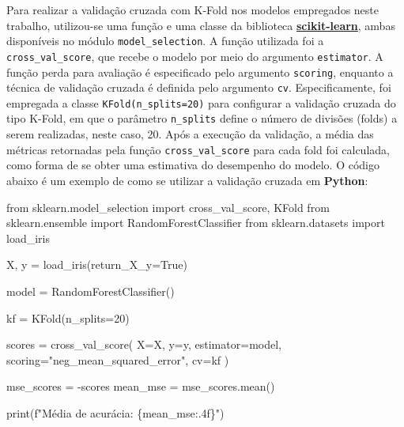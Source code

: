 \documentclass[
  12pt,
  a4paper,
]{scrreprt}
\newenvironment{Shaded}{}{}
\newcommand{\BuiltInTok}[1]{\textcolor[rgb]{0.84,0.23,0.29}{#1}}
\newcommand{\DecValTok}[1]{\textcolor[rgb]{0.00,0.36,0.77}{#1}}
\newcommand{\ImportTok}[1]{\textcolor[rgb]{0.01,0.18,0.38}{#1}}
\newcommand{\NormalTok}[1]{\textcolor[rgb]{0.14,0.16,0.18}{#1}}
\newcommand{\OperatorTok}[1]{\textcolor[rgb]{0.14,0.16,0.18}{#1}}
\newcommand{\SpecialCharTok}[1]{\textcolor[rgb]{0.00,0.36,0.77}{#1}}
\newcommand{\SpecialStringTok}[1]{\textcolor[rgb]{0.01,0.18,0.38}{#1}}
\newcommand{\StringTok}[1]{\textcolor[rgb]{0.01,0.18,0.38}{#1}}
\newcommand{\VariableTok}[1]{\textcolor[rgb]{0.89,0.38,0.04}{#1}}
\begin{document}
\vspace{12pt}

Para realizar a validação cruzada com K-Fold nos modelos empregados
neste trabalho, utilizou-se uma função e uma classe da biblioteca
\href{https://scikit-learn.org/stable/}{\textbf{scikit-learn}}, ambas
disponíveis no módulo \texttt{model\_selection}. A função utilizada foi
a \texttt{cross\_val\_score}, que recebe o modelo por meio do argumento
\texttt{estimator}. A função perda para avaliação é especificado pelo
argumento \texttt{scoring}, enquanto a técnica de validação cruzada é
definida pelo argumento \texttt{cv}. Especificamente, foi empregada a
classe \texttt{KFold(n\_splits=20)} para configurar a validação cruzada
do tipo K-Fold, em que o parâmetro \texttt{n\_splits} define o número de
divisões (folds) a serem realizadas, neste caso, 20. Após a execução da
validação, a média das métricas retornadas pela função
\texttt{cross\_val\_score} para cada fold foi calculada, como forma de
se obter uma estimativa do desempenho do modelo. O código abaixo é um
exemplo de como se utilizar a validação cruzada em \textbf{Python}:

\begin{Shaded}
\begin{Highlighting}[]
\ImportTok{from}\NormalTok{ sklearn.model\_selection }\ImportTok{import}\NormalTok{ cross\_val\_score, KFold}
\ImportTok{from}\NormalTok{ sklearn.ensemble }\ImportTok{import}\NormalTok{ RandomForestClassifier}
\ImportTok{from}\NormalTok{ sklearn.datasets }\ImportTok{import}\NormalTok{ load\_iris}

\NormalTok{X, y }\OperatorTok{=}\NormalTok{ load\_iris(return\_X\_y}\OperatorTok{=}\VariableTok{True}\NormalTok{)}

\NormalTok{model }\OperatorTok{=}\NormalTok{ RandomForestClassifier()}

\NormalTok{kf }\OperatorTok{=}\NormalTok{ KFold(n\_splits}\OperatorTok{=}\DecValTok{20}\NormalTok{)}

\NormalTok{scores }\OperatorTok{=}\NormalTok{ cross\_val\_score(}
\NormalTok{    X}\OperatorTok{=}\NormalTok{X, y}\OperatorTok{=}\NormalTok{y,}
\NormalTok{    estimator}\OperatorTok{=}\NormalTok{model,}
\NormalTok{    scoring}\OperatorTok{=}\StringTok{"neg\_mean\_squared\_error"}\NormalTok{,}
\NormalTok{    cv}\OperatorTok{=}\NormalTok{kf}
\NormalTok{)}

\NormalTok{mse\_scores }\OperatorTok{=} \OperatorTok{{-}}\NormalTok{scores}
\NormalTok{mean\_mse }\OperatorTok{=}\NormalTok{ mse\_scores.mean()}

\BuiltInTok{print}\NormalTok{(}\SpecialStringTok{f"Média de acurácia: }\SpecialCharTok{\{}\NormalTok{mean\_mse}\SpecialCharTok{:.4f\}}\SpecialStringTok{"}\NormalTok{)}
\end{Highlighting}
\end{Shaded}
\end{document}
